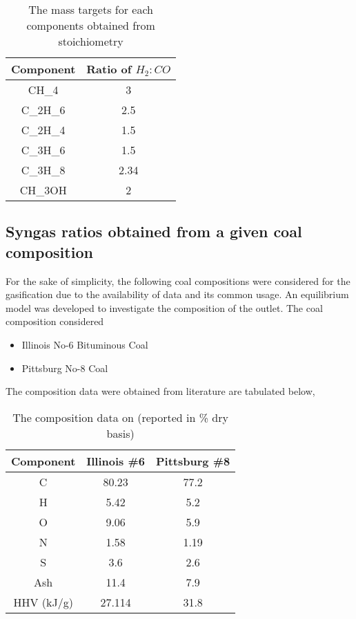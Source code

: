 \documentclass[journal=iecred,manuscript=article]{achemso}
\begin{document}
\FloatBarrier
\begin{table}[H]
\caption{The mass targets for each components obtained from stoichiometry}
\centering
\begin{tabular}{|c|c|}
\hline\hline
Component & Ratio of $H_2:CO$ \\
\hline
CH_4       & 3     \\
\hline
C_2H_6      & 2.5   \\
\hline
C_2H_4      &  1.5     \\
\hline
C_3H_6      & 1.5  \\
\hline
C_3H_8      & 2.34  \\
\hline
CH_3OH     & 2   \\
\hline 

\end{tabular}

\end{table}
\FloatBarrier


\subsection{Syngas ratios obtained from a given coal composition}
For the sake of simplicity, the following coal compositions were considered for the gasification due to the availability of data and its common usage. An equilibrium model was developed to investigate the composition of the outlet. The coal composition considered
\begin{itemize}
\item Illinois No-6 Bituminous Coal\cite{Floudas201016}
\item Pittsburg No-8 Coal\cite{CoalPer}
\end{itemize} 

The composition data were obtained from literature are tabulated below,
 
\FloatBarrier
\begin{table}
\centering
\caption{The composition data on (reported in \% dry basis)}
\begin{tabular}{|c|c|c|}
\hline\hline
Component & Illinois \#6 & Pittsburg \#8 \\
\hline
C      & 80.23   & 77.2 \\
\hline
H     & 5.42 & 5.2\\
\hline
O     & 9.06  & 5.9  \\
\hline
N      & 1.58 &  1.19 \\
\hline
S      & 3.6 &  2.6 \\
\hline
Ash     & 11.4 & 7.9 \\
\hline
HHV (kJ/g)     & 27.114 & 31.8 \\
\hline
 
\end{tabular}
\end{table}
\FloatBarrier
\end{document}
